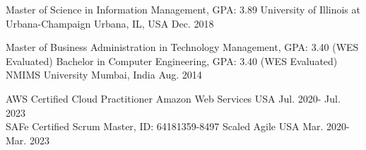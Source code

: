 

\begin{cventriesed}
{\vspace{-1.25mm}}
  \cventryed
    {Master of Science in Information Management, GPA: 3.89} %
    {University of Illinois at Urbana-Champaign}%
    {Urbana, IL, USA} %
    {Dec. 2018} %
    {\\}
    {\vspace{2.0mm}}

\cventryednew
    {Master of Business Administration in Technology Management, GPA: 3.40 (WES Evaluated)} %
    {Bachelor in Computer Engineering, GPA: 3.40 (WES Evaluated)} %
    {NMIMS University}%
    {Mumbai, India} %
    {Aug. 2014} %
    {\\}
    {\vspace{2.0mm}}

\cventryed
    {AWS Certified Cloud Practitioner} %
    {Amazon Web Services}%
    {USA} %
    {Jul. 2020- Jul. 2023} %
    {\\}
    {\vspace{2.0mm}}
\cventryed
    {SAFe Certified Scrum Master, ID: 64181359-8497} %
    {Scaled Agile}%
    {USA} %
    {Mar. 2020- Mar. 2023} %
    {\\}
\end{cventriesed}
